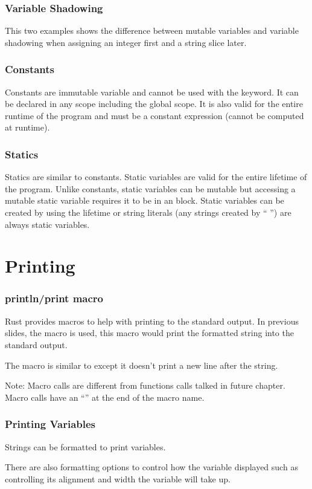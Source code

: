 \documentclass{beamer}
\begin{document}
\begin{frame}
  \frametitle{Variable Shadowing}
  This two examples shows the difference between mutable variables and variable shadowing when assigning an integer first and a string slice later.
  
  
\end{frame}

\begin{frame}
  \frametitle{Constants}
  Constants are immutable variable and cannot be used with the  keyword. It can be declared in any scope including the global scope. It is also valid for the entire runtime of the program and must be a constant expression (cannot be computed at runtime).
  
\end{frame}

\begin{frame}
  \frametitle{Statics}
  Statics are similar to constants. Static variables are valid for the entire lifetime of the program. Unlike constants, static variables can be mutable but accessing a mutable static variable requires it to be in an  block. Static variables can be created by using the  lifetime or string literals (any strings created by `` '') are always static variables.
  
\end{frame}

\section{Printing}
\begin{frame}
  \frametitle{println/print macro}
  Rust provides macros to help with printing to the standard output. In previous slides, the  macro is used, this macro would print the formatted string into the standard output.
  
  The  macro is similar to  except it doesn't print a new line after the string.

  \alert{Note:} Macro calls are different from functions calls talked in future chapter. Macro calls have an ``\!'' at the end of the macro name.
\end{frame}

\begin{frame}
  \frametitle{Printing Variables}
  Strings can be formatted to print variables.
  
  There are also formatting options to control how the variable displayed such as controlling its alignment and width the variable will take up.
  
\end{frame}
\end{document}
